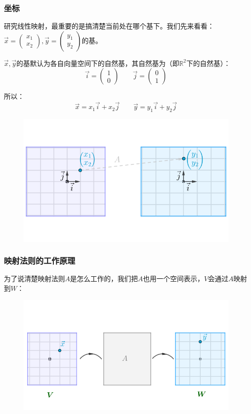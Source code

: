 \documentclass[12pt]{article}
\begin{document}
\subsubsection{坐标}
研究线性映射，最重要的是搞清楚当前处在哪个基下。我们先来看看：
$\vec{x}=\begin{pmatrix}x_1\\x_2\end{pmatrix},\vec{y}=\begin{pmatrix}y_1\\y_2\end{pmatrix}$的基。

$\vec{x},\vec{y}$的基默认为各自向量空间下的自然基，其自然基为（即$\mathbb{R}^2$下的自然基）：
$$\vec{i}=\begin{pmatrix}1\\0\end{pmatrix}\qquad\vec{j}=\begin{pmatrix}0\\1\end{pmatrix}$$

所以：
$$\vec{x}=x_1\vec{i}+x_2\vec{j}\qquad\vec{y}=y_1\vec{i}+y_2\vec{j}$$
\begin{figure}[H]
\centering
\includegraphics[width=.5\textwidth]{fig/UnderstandMatrixMultiplication_4.png}
\end{figure}

\subsubsection{映射法则的工作原理}
为了说清楚映射法则$A$是怎么工作的，我们把$A$也用一个空间表示，$V$会通过$A$映射到$W$：
\begin{figure}[H]
\centering
\includegraphics[width=.5\textwidth]{fig/UnderstandMatrixMultiplication_5.png}
\end{figure}
\end{document}
